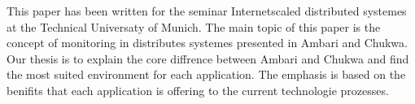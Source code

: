 This paper has been written for the seminar Internetscaled distributed systemes at the Technical Universaty of Munich. The main topic of this paper is the concept of monitoring in distributes systemes presented in Ambari and Chukwa. Our thesis is to explain the core diffrence between Ambari and Chukwa and find the most suited environment for each application. The emphasis is based on the benifits that each application is offering to the current technologie prozesses.
